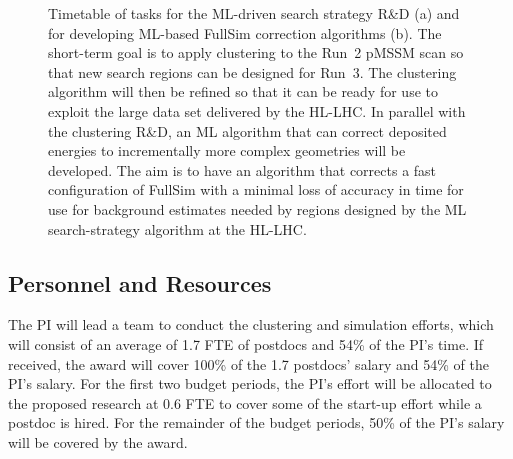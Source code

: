 \documentclass[letter, USenglish, 11pt, subfigure]{article}
\begin{document}
\begin{figure}[!htbp]
  \centering
  \caption{Timetable of tasks for the ML-driven search strategy R\&D (a) and for developing ML-based FullSim correction algorithms (b). The short-term goal is to apply clustering to the Run~2 pMSSM scan so that new search regions can be designed for Run~3. The clustering algorithm will then be refined so that it can be ready for use to exploit the large data set delivered by the HL-LHC.
    In parallel with the clustering R\&D, an ML algorithm that can correct deposited energies to incrementally more complex geometries will be developed. The aim is to have an algorithm that corrects a fast configuration of FullSim with a minimal loss of accuracy in time for use for background estimates needed by regions designed by the ML search-strategy algorithm at the HL-LHC.
  }
  \label{fig:timetable}
\end{figure}


\subsection{Personnel and Resources}
\label{sec:personnel}
The PI will lead a team to conduct the clustering and simulation efforts, which will consist of an average of 1.7 FTE of postdocs and 54\% of the PI's time. If received, the award will cover 100\% of the 1.7 postdocs' salary and 54\% of the PI's salary. For the first two budget periods, the PI's effort will be allocated to the proposed research at 0.6 FTE to cover some of the start-up effort while a postdoc is hired. For the remainder of the budget periods, 50\% of the PI's salary will be covered by the award.
\end{document}
